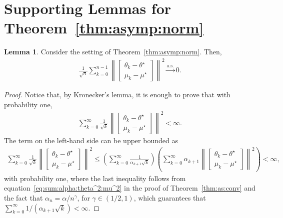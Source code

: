 \documentclass[11pt,a4paper]{article}
\theoremstyle{definition}
\newtheorem{lemma}[theorem]{Lemma}
\begin{document}





\section{Supporting Lemmas for Theorem~\ref{thm:asymp:norm}}


\begin{lemma}
\label{lemma:assump:conv:CLT}
Consider the setting of Theorem~\ref{thm:asymp:norm}. Then, 
\begin{align*}
    \frac{1}{\sqrt{n}} \sum_{k=0}^{n-1} \left\| \begin{bmatrix}
        \theta_k - \theta^\star \\ \mu_k - \mu^\star
    \end{bmatrix} \right\|^2 \overset{\text{a.s.}}{\to} 0.
\end{align*}
\end{lemma}
\begin{proof}
Notice that, by Kronecker's lemma, it is enough to prove that with probability one,
\begin{align*}
    \sum_{k=0}^{\infty} \frac{1}{\sqrt{k}} \left\| \begin{bmatrix}
        \theta_k - \theta^\star \\ \mu_k - \mu^\star
    \end{bmatrix} \right\|^2 < \infty.
\end{align*}
The term on the left-hand side can be upper bounded as
\begin{align*}
    \sum_{k=0}^{\infty} \frac{1}{\sqrt{k}} \left\| \begin{bmatrix}
        \theta_k - \theta^\star \\ \mu_k - \mu^\star
    \end{bmatrix} \right\|^2 
    \leq 
    \left( \sum_{k=0}^{\infty} \frac{1}{\alpha_{k+1} \sqrt{k}} \right) 
    \left( \sum_{k=0}^{\infty} \alpha_{k+1} \left\| \begin{bmatrix}
        \theta_k - \theta^\star \\ \mu_k - \mu^\star
    \end{bmatrix} \right\|^2 \right)<\infty,
\end{align*}
with probability one, where the last inequality follows from equation~\eqref{eq:sum:alpha:theta^2:mu^2} in the proof of Theorem~\ref{thm:as:conv} and the fact that $\alpha_n = \alpha/n^\gamma$, for $\gamma \in (1/2,1)$, which guarantees that $\sum_{k=0}^\infty 1/ (\alpha_{k+1} \sqrt{k}) < \infty$.
\end{proof}
\end{document}
